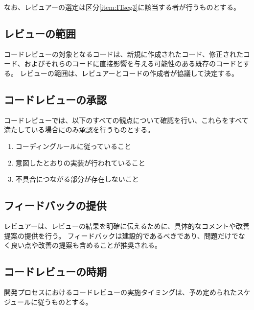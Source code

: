 なお、レビュアーの選定は区分\ref{item:ITseg3}\hx に該当する者が行うものとする。

\subsection{レビューの範囲}
コードレビューの対象となるコードは、新規に作成されたコード、修正されたコード、およびそれらのコードに直接影響を与える可能性のある既存のコードとする。
レビューの範囲は、レビュアーとコードの作成者が協議して決定する。

\subsection{コードレビューの承認}
コードレビューでは、以下のすべての観点について確認を行い、これらをすべて満たしている場合にのみ承認を行うものとする。
\begin{enumerate}[label=\sarrow]
\item コーディングルールに従っていること
\item 意図したとおりの実装が行われていること
\item 不具合につながる部分が存在しないこと
\end{enumerate}

\subsection{フィードバックの提供}
レビュアーは、レビューの結果を明確に伝えるために、具体的なコメントや改善提案の提供を行う。
フィードバックは建設的であるべきであり、問題だけでなく良い点や改善の提案も含めることが推奨される。

\subsection{コードレビューの時期}
開発プロセスにおけるコードレビューの実施タイミングは、予め定められたスケジュールに従うものとする。



